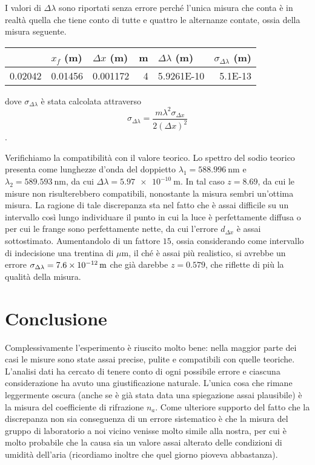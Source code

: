 \documentclass[a4paper,11pt]{article}
\begin{document}
	I valori di $\Delta \lambda$ sono riportati senza errore perché l'unica misura che conta è in realtà quella che tiene conto di tutte e quattro le alternanze contate, ossia della misura seguente.
	
	\begin{table}[htbp]
  \centering
    \begin{tabular}{rrrrrr}
    \bottomrule
    \rowcolor[rgb]{ .267,  .447,  .769} \multicolumn{1}{l}{\textcolor[rgb]{ 1,  1,  1}{\textbf{$x _i$ (m)}}} & \multicolumn{1}{l}{\textcolor[rgb]{ 1,  1,  1}{\textbf{$x _f$ (m)}}} & \multicolumn{1}{l}{\textcolor[rgb]{ 1,  1,  1}{\textbf{$\Delta x$ (m)}}} & \multicolumn{1}{l}{\textcolor[rgb]{ 1,  1,  1}{\textbf{m}}} & \multicolumn{1}{l}{\textcolor[rgb]{ 1,  1,  1}{\textbf{$\Delta \lambda$ (m)}}} & \multicolumn{1}{l}{\textcolor[rgb]{ 1,  1,  1}{\textbf{$\sigma _{\Delta \lambda}$ (m)}}} \\
    \toprule
    0.02042 & 0.01456 & 0.001172 & 4     & 5.9261E-10 & 5.1E-13 \\
    \toprule
    \end{tabular}%
\end{table}%

	dove $\sigma _{\Delta \lambda}$ è stata calcolata attraverso $$\sigma _{\Delta \lambda} = \frac{m \lambda^2 \sigma _{\Delta x}}{2 (\Delta x) ^2}$$.
	
	Verifichiamo la compatibilità con il valore teorico. Lo spettro del sodio teorico presenta come lunghezze d'onda del doppietto $\lambda _1 = \SI{588.996}{\nano \meter}$ e $\lambda _2 = \SI{589.593}{\nano \meter}$, da cui $\Delta \lambda = \SI{5.97e-10}{\meter}$. In tal caso $z = 8.69$, da cui le misure non risulterebbero compatibili, nonostante la misura sembri un'ottima misura. La ragione di tale discrepanza sta nel fatto che è assai difficile su un intervallo così lungo individuare il punto in cui la luce è perfettamente diffusa o per cui le frange sono perfettamente nette, da cui l'errore $d_{\Delta x}$ è assai sottostimato. Aumentandolo di un fattore $15$, ossia considerando come intervallo di indecisione una trentina di $\mu \text{m}$, il ché è assai più realistico, si avrebbe un errore $\sigma _{\Delta \lambda} = \SI{7.6E-12}{\meter}$ che già darebbe $z = 0.579$, che riflette di più la qualità della misura.
	
	\section{Conclusione}
	Complessivamente l'esperimento è riuscito molto bene: nella maggior parte dei casi le misure sono state assai precise, pulite e compatibili con quelle teoriche. L'analisi dati ha cercato di tenere conto di ogni possibile errore e ciascuna considerazione ha avuto una giustificazione naturale. L'unica cosa che rimane leggermente oscura (anche se è già stata data una spiegazione assai plausibile) è la misura del coefficiente di rifrazione $n _a$. Come ulteriore supporto del fatto che la discrepanza non sia conseguenza di un errore sistematico è che la misura del gruppo di laboratorio a noi vicino venisse molto simile alla nostra, per cui è molto probabile che la causa sia un valore assai alterato delle condizioni di umidità dell'aria (ricordiamo inoltre che quel giorno pioveva abbastanza). 
	
\end{document}
